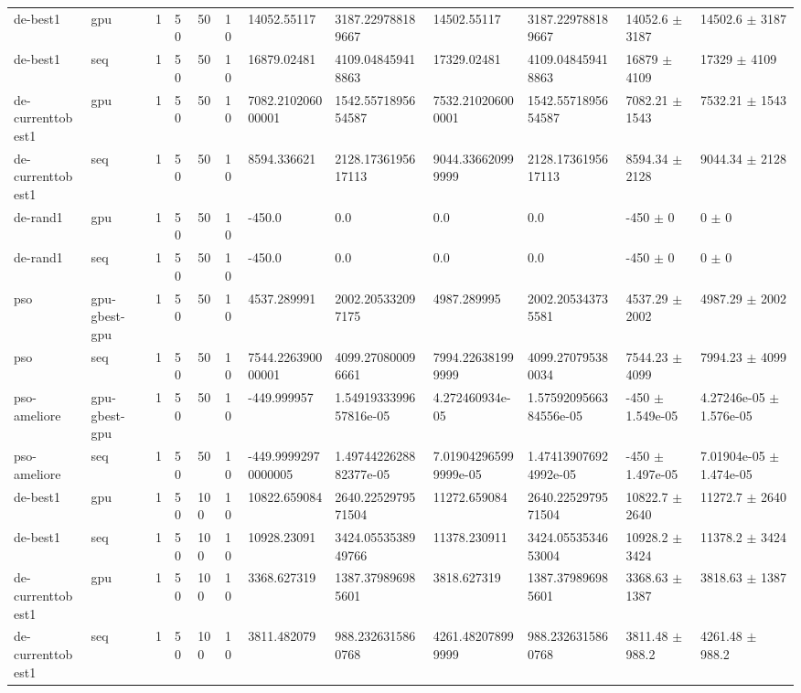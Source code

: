 \begin{table}[t]
\begin{tabular}{llllllllllll}
de-best1 & gpu & 1 & 50 & 50 & 10 & 14052.55117 & 3187.229788189667 & 14502.55117 & 3187.229788189667 & 14052.6 $\pm$ 3187 & 14502.6 $\pm$ 3187 \\
de-best1 & seq & 1 & 50 & 50 & 10 & 16879.02481 & 4109.048459418863 & 17329.02481 & 4109.048459418863 & 16879 $\pm$ 4109 & 17329 $\pm$ 4109 \\
de-currenttobest1 & gpu & 1 & 50 & 50 & 10 & 7082.210206000001 & 1542.5571895654587 & 7532.210206000001 & 1542.5571895654587 & 7082.21 $\pm$ 1543 & 7532.21 $\pm$ 1543 \\
de-currenttobest1 & seq & 1 & 50 & 50 & 10 & 8594.336621 & 2128.1736195617113 & 9044.336620999999 & 2128.1736195617113 & 8594.34 $\pm$ 2128 & 9044.34 $\pm$ 2128 \\
de-rand1 & gpu & 1 & 50 & 50 & 10 & -450.0 & 0.0 & 0.0 & 0.0 & -450 $\pm$ 0 & 0 $\pm$ 0 \\
de-rand1 & seq & 1 & 50 & 50 & 10 & -450.0 & 0.0 & 0.0 & 0.0 & -450 $\pm$ 0 & 0 $\pm$ 0 \\
pso & gpu-gbest-gpu & 1 & 50 & 50 & 10 & 4537.289991 & 2002.205332097175 & 4987.289995 & 2002.205343735581 & 4537.29 $\pm$ 2002 & 4987.29 $\pm$ 2002 \\
pso & seq & 1 & 50 & 50 & 10 & 7544.226390000001 & 4099.270800096661 & 7994.226381999999 & 4099.270795380034 & 7544.23 $\pm$ 4099 & 7994.23 $\pm$ 4099 \\
pso-ameliore & gpu-gbest-gpu & 1 & 50 & 50 & 10 & -449.999957 & 1.5491933399657816e-05 & 4.272460934e-05 & 1.5759209566384556e-05 & -450 $\pm$ 1.549e-05 & 4.27246e-05 $\pm$ 1.576e-05 \\
pso-ameliore & seq & 1 & 50 & 50 & 10 & -449.99992970000005 & 1.4974422628882377e-05 & 7.019042965999999e-05 & 1.474139076924992e-05 & -450 $\pm$ 1.497e-05 & 7.01904e-05 $\pm$ 1.474e-05 \\
de-best1 & gpu & 1 & 50 & 100 & 10 & 10822.659084 & 2640.2252979571504 & 11272.659084 & 2640.2252979571504 & 10822.7 $\pm$ 2640 & 11272.7 $\pm$ 2640 \\
de-best1 & seq & 1 & 50 & 100 & 10 & 10928.23091 & 3424.0553538949766 & 11378.230911 & 3424.0553534653004 & 10928.2 $\pm$ 3424 & 11378.2 $\pm$ 3424 \\
de-currenttobest1 & gpu & 1 & 50 & 100 & 10 & 3368.627319 & 1387.379896985601 & 3818.627319 & 1387.379896985601 & 3368.63 $\pm$ 1387 & 3818.63 $\pm$ 1387 \\
de-currenttobest1 & seq & 1 & 50 & 100 & 10 & 3811.482079 & 988.2326315860768 & 4261.482078999999 & 988.2326315860768 & 3811.48 $\pm$ 988.2 & 4261.48 $\pm$ 988.2 \\

\end{tabular}
\end{table}
